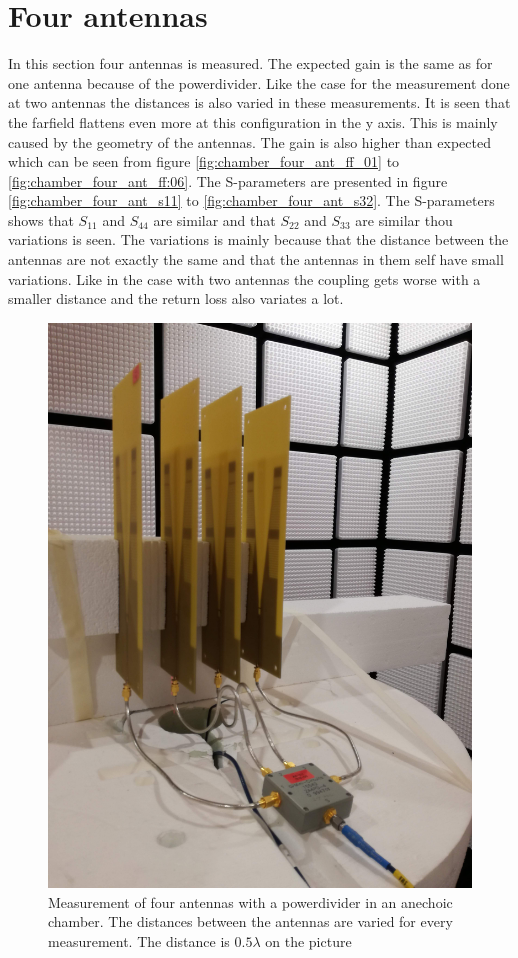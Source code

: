 \section{Four antennas}
In this section four antennas is measured. The expected gain is the same as for one antenna because of the powerdivider. Like the case for the measurement done at two antennas the distances is also varied in these measurements. It is seen that the farfield flattens even more at this configuration in the y axis. This is mainly caused by the geometry of the antennas. The gain is also higher than expected which can be seen from figure \ref{fig:chamber_four_ant_ff_01} to \ref{fig:chamber_four_ant_ff:06}. The S-parameters are presented in figure  \ref{fig:chamber_four_ant_s11} to \ref{fig:chamber_four_ant_s32}. The S-parameters shows that $S_{11}$ and $S_{44}$ are similar and that $S_{22}$ and $S_{33}$ are similar thou variations is seen. The variations is mainly because that the distance between the antennas are not exactly the same and that the antennas in them self have small variations. Like in the case with two antennas the coupling gets worse with a smaller distance and the return loss also variates a lot. 

\begin{figure}[H]
\centering 
\includegraphics[scale = 0.05]{figures/measurement/antennas/four_ant.jpg}
\caption{Measurement of four antennas with a powerdivider in an anechoic chamber. The distances between the antennas are varied for every measurement. The distance is $0.5\lambda$ on the picture}
\label{fig:chamber_four_ant}
\end{figure} 


